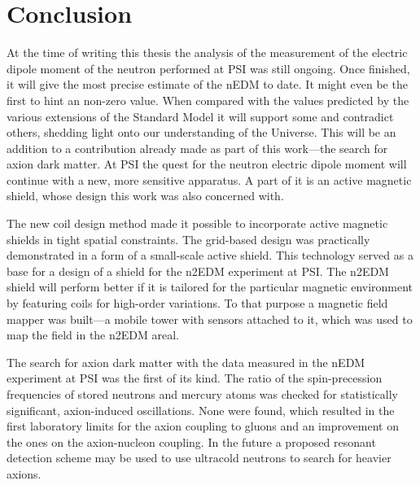 
\begingroup

\let\clearpage\relax
\let\cleardoublepage\relax
\let\cleardoublepage\relax

\chapter*{Conclusion}
At the time of writing this thesis the analysis of the measurement of the electric dipole moment of the neutron performed at PSI was still ongoing.
Once finished, it will give the most precise estimate of the nEDM to date.
It might even be the first to hint an non-zero value.
When compared with the values predicted by the various extensions of the Standard Model it will support some and contradict others, shedding light onto our understanding of the Universe.
This will be an addition to a contribution already made as part of this work---the search for axion dark matter.
At PSI the quest for the neutron electric dipole moment will continue with a new, more sensitive apparatus.
A part of it is an active magnetic shield, whose design this work was also concerned with.

The new coil design method made it possible to incorporate active magnetic shields in tight spatial constraints.
The grid-based design was practically demonstrated in a form of a small-scale active shield.
This technology served as a base for a design of a shield for the n2EDM experiment at PSI\@.
The n2EDM shield will perform better if it is tailored for the particular magnetic environment by featuring coils for high-order variations.
To that purpose a magnetic field mapper was built---a mobile tower with sensors attached to it, which was used to map the field in the n2EDM areal.

The search for axion dark matter with the data measured in the nEDM experiment at PSI was the first of its kind.
The ratio of the spin-precession frequencies of stored neutrons and mercury atoms was checked for statistically significant, axion-induced oscillations.
None were found, which resulted in the first laboratory limits for the axion coupling to gluons and an improvement on the ones on the axion-nucleon coupling.
In the future a proposed resonant detection scheme may be used to use ultracold neutrons to search for heavier axions.

\endgroup